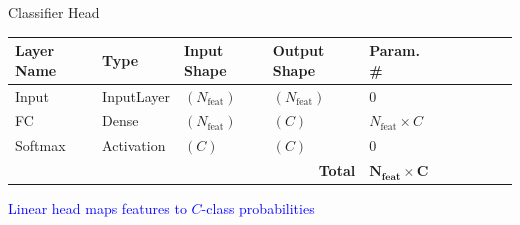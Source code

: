 \documentclass[aspectratio=169]{beamer}
\begin{document}
\begin{frame}{Classifier Head}

\begin{table}
\begin{tabularx}{\linewidth}{p{2.6cm}p{3.5cm}p{2.6cm}p{2.8cm}p{2.6cm}lcccc}
\toprule
\textbf{Layer Name} & \textbf{Type} & \textbf{Input Shape} & \textbf{Output Shape} & \textbf{Param. \#} \\
\midrule
Input   & InputLayer & $(N_{\text{feat}})$ & $(N_{\text{feat}})$ & $0$ \\
FC      & Dense      & $(N_{\text{feat}})$ & $(C)$               & $N_{\text{feat}}\!\times\! C$ \\
Softmax & Activation & $(C)$               & $(C)$               & $0$ \\
\midrule
\multicolumn{4}{r}{\textbf{Total}} & $\mathbf{N_{\text{feat}} \times C}$ \\

\midrule

\end{tabularx}
\end{table}

\begin{center}
\textcolor{blue}{Linear head maps features to $C$-class probabilities}
\end{center}
\end{frame}
\end{document}
